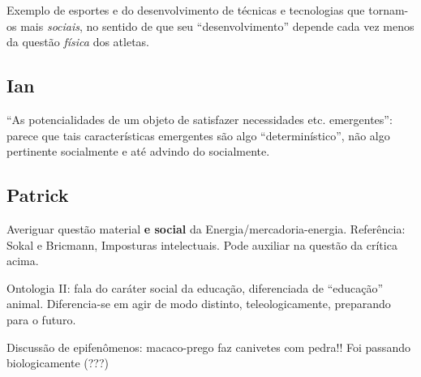 \documentclass[12pt]{article}
\begin{document}
Exemplo de esportes e do desenvolvimento de técnicas e tecnologias que tornam-os mais \textit{sociais}, no sentido de que seu ``desenvolvimento'' depende cada vez menos da questão \textit{física} dos atletas.

\subsection{Ian}
``As potencialidades de um objeto de satisfazer necessidades etc. emergentes'': parece que tais características emergentes são algo ``determinístico'', não algo pertinente socialmente e até advindo do socialmente.

\subsection{Patrick}
Averiguar questão material \textbf{e social} da Energia/mercadoria-energia. Referência: Sokal e Bricmann, Imposturas intelectuais. Pode auxiliar na questão da crítica acima.

Ontologia II: fala do caráter social da educação, diferenciada de ``educação'' animal. Diferencia-se em agir de modo distinto, teleologicamente, preparando para o futuro. 

Discussão de epifenômenos: macaco-prego faz canivetes com pedra!! Foi passando biologicamente (???)



\printbibliography
\end{document}
